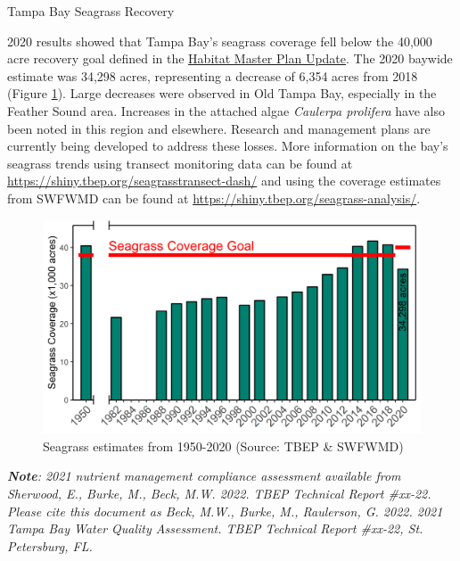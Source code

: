 \documentclass[final,t]{beamer}\usepackage[]{graphicx}\usepackage[]{color}
\begin{document}
\begin{frame}
\begin{columns}[t]
\begin{column}{.79\linewidth}
\begin{block}{Tampa Bay Seagrass Recovery}
\vspace{-0.15in}
\begin{minipage}{0.6\textwidth}
\footnotesize
2020 results showed that Tampa Bay's seagrass coverage fell below the 40,000 acre recovery goal defined in the \href{https://tbep.org/habitat-master-plan-update/}{Habitat Master Plan Update}. The 2020 baywide estimate was 34,298 acres, representing a decrease of 6,354 acres from 2018 (Figure \ref{fig:sgtrnd}). Large decreases were observed in Old Tampa Bay, especially in the Feather Sound area. Increases in the attached algae \textit{Caulerpa prolifera} have also been noted in this region and elsewhere. Research and management plans are currently being developed to address these losses. More information on the bay's seagrass trends using transect monitoring data can be found at \href{https://shiny.tbep.org/seagrasstransect-dash/}{https://shiny.tbep.org/seagrasstransect-dash/} and using the coverage estimates from SWFWMD can be found at \href{https://shiny.tbep.org/seagrass-analysis/}{https://shiny.tbep.org/seagrass-analysis/}.
\end{minipage}
\hspace{0.2in}
\begin{minipage}{0.32\textwidth}
\vspace{0.1in}
\begin{figure}
\includegraphics[width=\textwidth, trim = 0cm 0cm 0cm -1cm]{www/seagrasscov.png}
\caption{\footnotesize Seagrass estimates from 1950-2020 (Source: TBEP \& SWFWMD)}
\label{fig:sgtrnd}
\end{figure}
\end{minipage}
\end{block}

\vspace{-0.15in}

\tiny \textit{\textbf{Note}: 2021 nutrient management compliance assessment available from Sherwood, E., Burke, M., Beck, M.W. 2022. TBEP Technical Report \#xx-22.  Please cite this document as Beck, M.W., Burke, M., Raulerson, G. 2022. 2021 Tampa Bay Water Quality Assessment. TBEP Technical Report \#xx-22, St. Petersburg, FL.} \\

\end{column}

\end{columns}

\end{frame}
\end{document}
